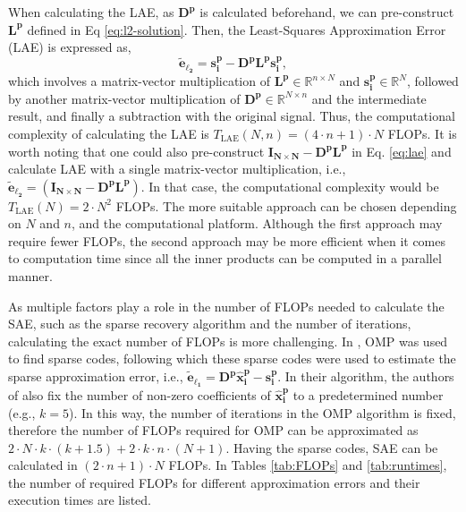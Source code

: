 \documentclass[journal,transmag]{IEEEtran}
\begin{document}
When calculating the LAE, as $\bm{D^p}$ is calculated beforehand, we can pre-construct $\bm{L^p}$ defined in Eq \ref{eq:l2-solution}. Then, the Least-Squares Approximation Error (LAE) is expressed as,
\begin{equation} \label{eq:lae}
    \bm{\widetilde{e}_{\ell_2}} = \bm{s_i^p - D^p L^p s_i^p},
\end{equation}
which involves a matrix-vector multiplication of $\bm{L^p} \in \mathbb{R}^{n \times N}$ and $\bm{s_i^p} \in \mathbb{R}^{N}$, followed by another matrix-vector multiplication of $\bm{D^p} \in \mathbb{R}^{N \times n}$ and the intermediate result, and finally a subtraction with the original signal. Thus, the computational complexity of calculating the LAE is $T_{\text{LAE}}(N, n) = \left(4 \cdot n + 1\right) \cdot N$ FLOPs. It is worth noting that one could also pre-construct $\bm{I_{N\times N}}- \bm{D^p L^p} $ in Eq. \eqref{eq:lae} and calculate LAE with a single matrix-vector multiplication, i.e., $\bm{\widetilde{e}_{\ell_2}} = \left( \bm{I_{N\times N}} - \bm{D^p L^p} \right)$. In that case, the computational complexity would be $T_{\text{LAE}}(N) = 2 \cdot N^2$ FLOPs. The more suitable approach can be chosen depending on $N$ and $n$, and the computational platform. Although the first approach may require fewer FLOPs, the second approach may be more efficient when it comes to computation time since all the inner products can be computed in a parallel manner.

As multiple factors play a role in the number of FLOPs needed to calculate the SAE, such as the sparse recovery algorithm and the number of iterations, calculating the exact number of FLOPs is more challenging. In \cite{carrera2016ecg}, OMP was used to find sparse codes, following which these sparse codes were used to estimate the sparse approximation error, i.e., $\bm{\widetilde{e}_{\ell_1}} = \bm{D^p} {\bm{\hat{x}^p_i}}-\bm{s^p_i}$. In their algorithm, the authors of \cite{carrera2016ecg} also fix the number of non-zero coefficients of $\bm{\hat{x}^p_i}$ to a predetermined number (e.g., $k=5$). In this way, the number of iterations in the OMP algorithm is fixed, therefore the number of FLOPs required for OMP can be approximated as $2 \cdot N \cdot k \cdot \left(k + 1.5  \right) + 2 \cdot k \cdot n \cdot \left(N + 1 \right)$. Having the sparse codes, SAE can be calculated in $(2 \cdot n+1) \cdot N$ FLOPs. In Tables \ref{tab:FLOPs} and \ref{tab:runtimes}, the number of required FLOPs for different approximation errors and their execution times are listed.
\end{document}
